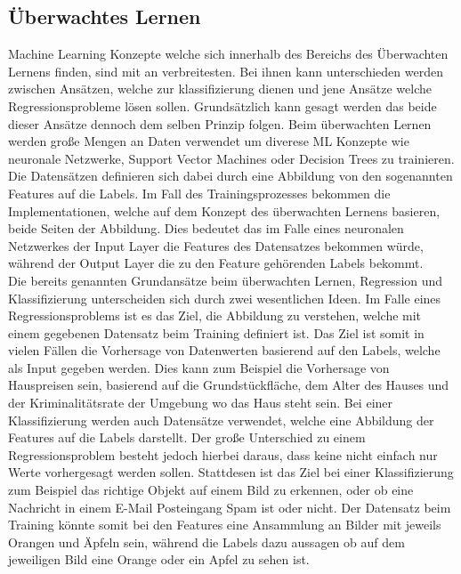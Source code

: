 \documentclass[]{iat}
\begin{document}
\subsection{Überwachtes Lernen} \label{sec:ueberwachtes_lernen}
Machine Learning Konzepte welche sich innerhalb des Bereichs des Überwachten Lernens finden, sind mit an verbreitesten. Bei ihnen kann unterschieden werden zwischen Ansätzen, welche zur klassifizierung dienen und jene Ansätze welche Regressionsprobleme lösen sollen. Grundsätzlich kann gesagt werden das beide dieser Ansätze dennoch dem selben Prinzip folgen. Beim überwachten Lernen werden große Mengen an Daten verwendet um diverese ML Konzepte wie neuronale Netzwerke, Support Vector Machines oder Decision Trees zu trainieren. Die Datensätzen definieren sich dabei durch eine Abbildung von den sogenannten Features auf die Labels. Im Fall des Trainingsprozesses bekommen die Implementationen, welche auf dem Konzept des überwachten Lernens basieren, beide Seiten der Abbildung. Dies bedeutet das im Falle eines neuronalen Netzwerkes der Input Layer die Features des Datensatzes bekommen würde, während der Output Layer die zu den Feature gehörenden Labels bekommt.\\
Die bereits genannten Grundansätze beim überwachten Lernen, Regression und Klassifizierung unterscheiden sich durch zwei wesentlichen Ideen. Im Falle eines Regressionsproblems ist es das Ziel, die Abbildung zu verstehen, welche mit einem gegebenen Datensatz beim Training definiert ist. Das Ziel ist somit in vielen Fällen die Vorhersage von Datenwerten basierend auf den Labels, welche als Input gegeben werden. Dies kann zum Beispiel die Vorhersage von Hauspreisen sein, basierend auf die Grundstückfläche, dem Alter des Hauses und der Kriminalitätsrate der Umgebung wo das Haus steht sein. Bei einer Klassifizierung werden auch Datensätze verwendet, welche eine Abbildung der Features auf die Labels darstellt. Der große Unterschied zu einem Regressionsproblem besteht jedoch hierbei daraus, dass keine nicht einfach nur Werte vorhergesagt werden sollen. Stattdesen ist das Ziel bei einer Klassifizierung zum Beispiel das richtige Objekt auf einem Bild zu erkennen, oder ob eine Nachricht in einem E-Mail Posteingang Spam ist oder nicht. Der Datensatz beim Training könnte somit bei den Features eine Ansammlung an Bilder mit jeweils Orangen und Äpfeln sein, während die Labels dazu aussagen ob auf dem jeweiligen Bild eine Orange oder ein Apfel zu sehen ist.
\end{document}
